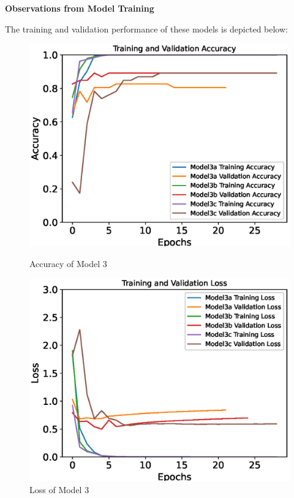 \textbf{Observations from Model Training}

The training and validation performance of these models is depicted below:

\begin{figure}[H]
    \centering
    \begin{minipage}{0.49\textwidth}
        \centering
        \includegraphics[width=\textwidth]{./fig/model3/accuracy33.eps}
        \caption{Accuracy of Model 3}
        \label{fig:model33_acc}
    \end{minipage}
    \begin{minipage}{0.49\textwidth}
        \centering
        \includegraphics[width=\textwidth]{./fig/model3/loss33.eps}
        \caption{Loss of Model 3}
        \label{fig:model33_loss}
    \end{minipage}
\end{figure}

